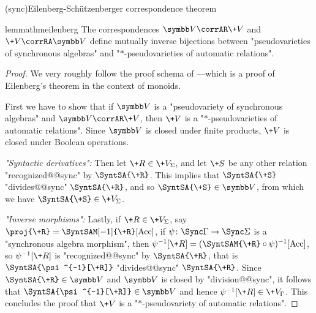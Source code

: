 \AP{}(sync){Eilenberg-Schützenberger correspondence theorem}\vspace{-1em}
\begin{restatable}{lemma}{thmeilenberg}
	\AP\label{lem:eilenberg-sy}
	The correspondences $\B{V} \corrAR \+V$ and $\+V \corrRA \B{V}$ define
	mutually inverse bijections between "pseudovarieties of
	synchronous algebras" and "$\ast$-pseudovarieties of automatic relations".
\end{restatable}

\begin{proof}
	We very roughly follow the proof schema of \cite[\S XIII.4, pp.~226--229]{Pin2022MathematicalFoundations}---which is
	a proof of Eilenberg's theorem in the context of monoids.

	First we have to show that if $\B{V}$ is a "pseudovariety
	of synchronous algebras" and $\B{V} \corrAR \+V$, then $\+V$ is a
	"$\ast$-pseudovarieties of automatic relations".
	Since $\B{V}$ is closed under finite products, $\+V$ is closed under Boolean operations.

	\emph{"Syntactic derivatives":} Then let $\+R \in \+V_\Sigma$, and let $\+S$ be any other relation
	"recognized@@sync" by $\SyntSA{\+R}$. This implies that $\SyntSA{\+S}$
	"divides@@sync" $\SyntSA{\+R}$, and so $\SyntSA{\+S} \in \B{V}$, from which
	we have $\SyntSA{\+S} \in \+V_\Sigma$.

	\emph{"Inverse morphisms":} Lastly, if $\+R \in \+V_\Sigma$, say $\proj{\+R} = \SyntSAM[-1]{\+R}[\Acc]$,
	if $\psi\colon \Sync\Gamma \to \Sync\Sigma$ is a "synchronous algebra morphism",
	then $\psi^{-1}[\+R] = (\SyntSAM{\+R} \circ \psi)^{-1}[\Acc]$, so
	$\psi^{-1}[\+R]$ is "recognized@@sync" by $\SyntSA{\+R}$, that is
	$\SyntSA{\psi^{-1}[\+R]}$ "divides@@sync" $\SyntSA{\+R}$. Since $\SyntSA{\+R} \in \B{V}$
	and $\B{V}$ is closed by "division@@sync", it follows that $\SyntSA{\psi^{-1}[\+R]} \in \B{V}$
	and hence $\psi^{-1}[\+R] \in \+V_{\Gamma}$. 
	This concludes the proof that $\+V$ is a "$\ast$-pseudovariety of automatic relations".


\end{proof}

